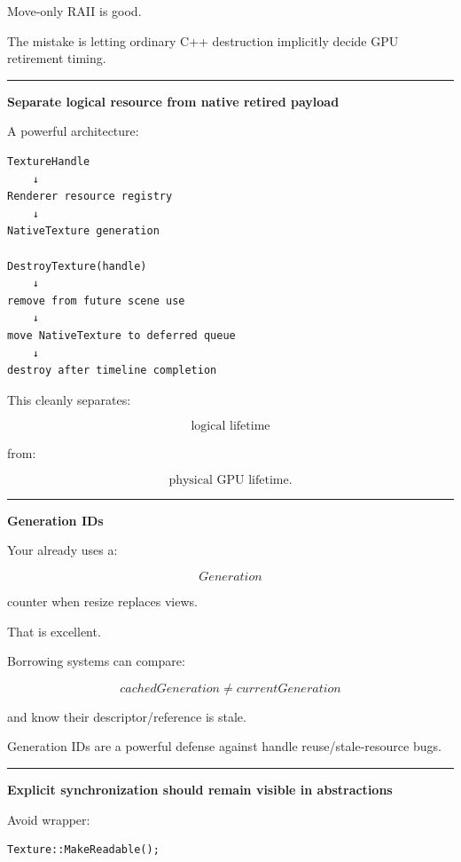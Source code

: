 Move-only RAII is good.

The mistake is letting ordinary C++ destruction implicitly decide GPU retirement timing.

\begin{center}\rule{0.5\linewidth}{0.5pt}\end{center}

\textbf{Separate logical resource from native retired payload}

A powerful architecture:

\begin{verbatim}
TextureHandle
    ↓
Renderer resource registry
    ↓
NativeTexture generation

DestroyTexture(handle)
    ↓
remove from future scene use
    ↓
move NativeTexture to deferred queue
    ↓
destroy after timeline completion
\end{verbatim}

This cleanly separates:

\[
\text{logical lifetime}
\]

from:

\[
\text{physical GPU lifetime}.
\]

\begin{center}\rule{0.5\linewidth}{0.5pt}\end{center}

\textbf{Generation IDs}

Your  already uses a:

\[
Generation
\]

counter when resize replaces views.

That is excellent.

Borrowing systems can compare:

\[
cachedGeneration
\neq
currentGeneration
\]

and know their descriptor/reference is stale.

Generation IDs are a powerful defense against handle reuse/stale-resource bugs.

\begin{center}\rule{0.5\linewidth}{0.5pt}\end{center}

\textbf{Explicit synchronization should remain visible in abstractions}

Avoid wrapper:

\begin{verbatim}
Texture::MakeReadable();
\end{verbatim}

